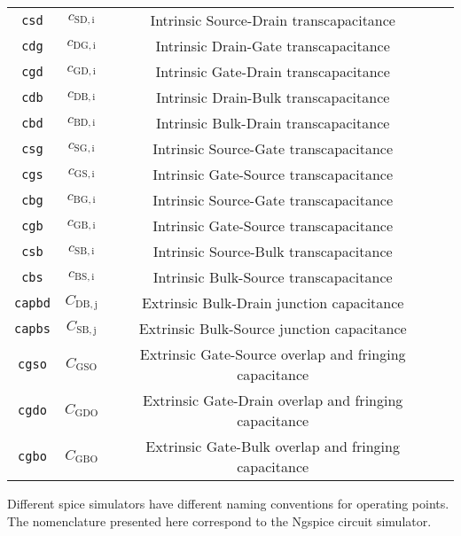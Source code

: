 \documentclass{article}[11pt]
\begin{document}
\begin{table}[H]
\begin{tabular}{cccl}
\texttt{csd}         & $c_{\mathrm{SD,i}}$    & Intrinsic Source-Drain transcapacitance                \\ 
\texttt{cdg}         & $c_{\mathrm{DG,i}}$    & Intrinsic Drain-Gate transcapacitance                  \\ 
\texttt{cgd}         & $c_{\mathrm{GD,i}}$    & Intrinsic Gate-Drain transcapacitance                  \\ 
\texttt{cdb}         & $c_{\mathrm{DB,i}}$    & Intrinsic Drain-Bulk transcapacitance                  \\ 
\texttt{cbd}         & $c_{\mathrm{BD,i}}$    & Intrinsic Bulk-Drain transcapacitance                  \\ 
\texttt{csg}         & $c_{\mathrm{SG,i}}$    & Intrinsic Source-Gate transcapacitance                 \\ 
\texttt{cgs}         & $c_{\mathrm{GS,i}}$    & Intrinsic Gate-Source transcapacitance                 \\
\texttt{cbg}         & $c_{\mathrm{BG,i}}$    & Intrinsic Source-Gate transcapacitance                 \\
\texttt{cgb}         & $c_{\mathrm{GB,i}}$    & Intrinsic Gate-Source transcapacitance                 \\
\texttt{csb}         & $c_{\mathrm{SB,i}}$    & Intrinsic Source-Bulk transcapacitance                 \\
\texttt{cbs}         & $c_{\mathrm{BS,i}}$    & Intrinsic Bulk-Source transcapacitance                 \\
\texttt{capbd}       & $C_{\mathrm{DB,j}}$    & Extrinsic Bulk-Drain junction capacitance              \\
\texttt{capbs}       & $C_{\mathrm{SB,j}}$    & Extrinsic Bulk-Source junction capacitance             \\
\texttt{cgso}        & $C_{\mathrm{GSO}}$     & Extrinsic Gate-Source overlap and fringing capacitance \\
\texttt{cgdo}        & $C_{\mathrm{GDO}}$     & Extrinsic Gate-Drain overlap and fringing capacitance  \\
\texttt{cgbo}        & $C_{\mathrm{GBO}}$     & Extrinsic Gate-Bulk overlap and fringing capacitance   \\ \toprule
\end{tabular}
\label{tab:oppoints}
\end{table}

Different \gls{spice} simulators have different naming conventions for 
operating points.
The nomenclature presented here correspond to the Ngspice circuit simulator.
\end{document}

